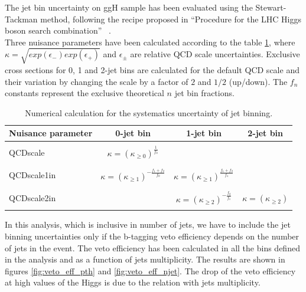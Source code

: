 The jet bin uncertainty on ggH sample has been evaluated using the Stewart-Tackman method, following the recipe proposed in ``Procedure for the LHC Higgs boson search combination'' ~\cite{CMS-NOTE-2011-005}.\\
Three nuisance parameters have been calculated according to the table \ref{table:jet_binning_theory}, where $\kappa = \sqrt{exp(\epsilon_{-}) exp(\epsilon_{+})}$ and $\epsilon_{\pm}$ are relative QCD scale uncertainties. Exclusive cross sections for 0, 1 and 2-jet bins are calculated for the default QCD scale and their variation by changing the scale by a factor of $2$ and $1/2$ (up/down). The $f_n$ constants represent the exclusive theoretical $n$ jet bin fractions.

\begin{table}[h]
\caption{Numerical calculation for the systematics uncertainty of jet binning.}
\label{table:jet_binning_theory}
\begin{center}
\begin{tabular}{|l|c|c|c|}
\hline
Nuisance parameter & 0-jet bin                                              & 1-jet bin                                            & 2-jet bin \\ 
\hline
&&& \\
QCDscale           & $\kappa = (\kappa_{\ge 0})^{\frac{1}{f_0}} $           &                                                      & \\ 
&&&\\\hline
&&&\\
QCDscale1in        & $\kappa = (\kappa_{\ge 1})^{- \frac{f_1 + f_2}{f_0}} $ & $\kappa = (\kappa_{\ge 1})^{\frac{f_1 + f_2}{f_1}} $ & \\ 
&&&\\ \hline
&&&\\
QCDscale2in        &                                                        & $\kappa = (\kappa_{\ge 2})^{- \frac{f_2}{f_1}} $     & $\kappa = (\kappa_{\ge 2})$ \\ 
&&&\\\hline

\end{tabular}
\end{center}
\end{table}

In this analysis, which is inclusive in number of jets, we have to include the jet binning uncertainties only if the b-tagging veto efficiency depends on the number of jets in the event. The veto efficiency has been calculated in all the \pth bins defined in the analysis and as a function of jets multiplicity. The results are shown in figures \ref{fig:veto_eff_pth} and \ref{fig:veto_eff_njet}. The drop of the veto efficiency at high values of the Higgs \pt is due to the relation with jets multiplicity.

